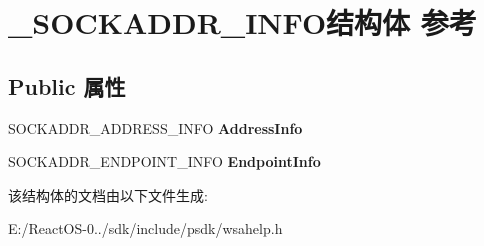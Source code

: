 \hypertarget{struct___s_o_c_k_a_d_d_r___i_n_f_o}{}\section{\+\_\+\+S\+O\+C\+K\+A\+D\+D\+R\+\_\+\+I\+N\+F\+O结构体 参考}
\label{struct___s_o_c_k_a_d_d_r___i_n_f_o}
\subsection*{Public 属性}
\begin{DoxyCompactItemize}
\item 
\mbox{\label{struct___s_o_c_k_a_d_d_r___i_n_f_o_a18fa6bed8f3e992a8da7498b5aa8cc02}} 
S\+O\+C\+K\+A\+D\+D\+R\+\_\+\+A\+D\+D\+R\+E\+S\+S\+\_\+\+I\+N\+FO {\bfseries Address\+Info}
\item 
\mbox{\label{struct___s_o_c_k_a_d_d_r___i_n_f_o_a6b3f64207ae029582709911ce4028ca5}} 
S\+O\+C\+K\+A\+D\+D\+R\+\_\+\+E\+N\+D\+P\+O\+I\+N\+T\+\_\+\+I\+N\+FO {\bfseries Endpoint\+Info}
\end{DoxyCompactItemize}


该结构体的文档由以下文件生成\+:\begin{DoxyCompactItemize}
\item 
E\+:/\+React\+O\+S-\/0../sdk/include/psdk/wsahelp.\+h\end{DoxyCompactItemize}
